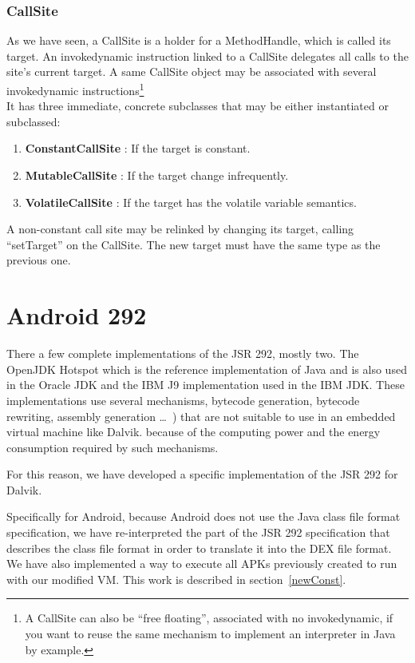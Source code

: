 \documentclass{sig-alternate}
\def \DALVIK{Dalvik\xspace}
\def \Jsr{JSR\xspace}
\def \JSR{\Jsr 292\xspace}
\begin{document}
    \subsubsection{CallSite}

      As we have seen, a CallSite is a holder for a MethodHandle, which is called its target.
      An invokedynamic instruction linked to a CallSite delegates all calls to the site's current target.
      A same CallSite object may be associated with several invokedynamic
      instructions\footnote{A CallSite can also be ``free floating'', associated with no invokedynamic,
      if you want to reuse the same mechanism to implement an interpreter in Java by example.}\\

      It has three immediate, concrete subclasses that may be either instantiated or subclassed:
      \begin{enumerate}
        \item \textbf{ConstantCallSite} : If the target is constant.
        \item \textbf{MutableCallSite}  : If the target change infrequently.
        \item \textbf{VolatileCallSite} : If the target has the volatile variable semantics.
      \end{enumerate}
      A non-constant call site may be relinked by changing its target, calling ``setTarget'' on the CallSite.
      The new target must have the same type as the previous one.

\section{Android 292}
  There a few complete implementations of the \JSR, mostly two.
  The OpenJDK Hotspot which is the reference implementation of Java and is also used in the Oracle JDK
  and the IBM J9 implementation used in the IBM JDK.
  These implementations use several mechanisms, bytecode generation, bytecode rewriting, assembly generation
  \dots~\cite{jvmsummit-heidinga-mhimpl-2010}\cite{jvmsummit-heidinga-mhimpl-2011}\cite{jvmsummit-rose-mhimpl-2011})
  that are not suitable to use in an embedded virtual machine like \DALVIK.
  because of the computing power and the energy consumption required by such mechanisms.

  For this reason, we have developed a specific implementation of the \JSR for \DALVIK.

  Specifically for Android, because Android does not use the Java class file format specification,
  we have re-interpreted the part of the \JSR specification that describes the class file format
  in order to translate it into the DEX file format.
  We have also implemented a way to execute all APKs previously created to run with our modified VM.
  This work is described in section~\ref{newConst}.
  
\end{document}
